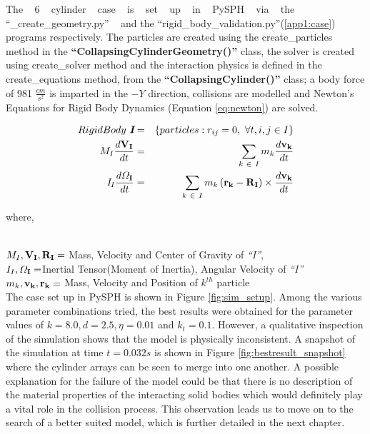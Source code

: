 The ~ 6 ~ cylinder ~ case ~ is ~ set ~ up ~ in ~ PySPH ~ via ~ the ~ ``\_create\_geometry.py'' ~ and the   ``rigid\_body\_validation.py''(\ref{app1:case}) programs respectively. The particles are created using the create\_particles method in the \textbf{``CollapsingCylinderGeometry()''} class, the solver is created using create\_solver method and the interaction physics is defined in the create\_equations method, from the \textbf{``CollapsingCylinder()''} class; a body force of 981 $\frac{cm}{s^2}$ is imparted in the $-Y$ direction, collisions are modelled and Newton's Equations for Rigid Body Dynamics (Equation \ref{eq:newton}) are solved.

\begin{eqnarray}\label{eq:newton}
Rigid Body ~{\textit{\textbf{I}}} &=& \left\lbrace particles : r_{ij} = 0, ~ \forall t , i,j \in I\right\rbrace \nonumber \\
M_{I}\frac{d{\it{{\bf{V_I}}}}}{dt} &=& \sum_{k~\in~I} m_{k} \frac{d{\it{{\bf{v_k}}}}}{dt} \\
{\bf{\it{I_I}}} \frac{d{\bf{\varOmega _{I}}}}{dt} &=& \sum_{k~\in~I} m_{k}\left( {\bf{r_k - R_I}}\right) \times \frac{d{\it{{\bf{v_k}}}}}{dt} \nonumber
\end{eqnarray}

{\raggedright{where,}} \\
$M_I , {\it{\bf{V_I}}}, {\it{\bf{R_I}}} = $ Mass, Velocity and Center of Gravity of {\it{``I''}}, \\
$I_I , {{\bf{\varOmega _{I}}}} = $Inertial Tensor(Moment of Inertia), Angular Velocity of {\it{``I''}} \\
$m_k , {\it{{\bf{v_k}}}}, \bf{r_k} =$ Mass, Velocity and Position of $k^{th}$ particle\\

The case set up in PySPH is shown in Figure \ref{fig:sim_setup}. Among the various parameter combinations tried, the best results were obtained for the parameter values of $k = 8.0, d = 2.5, \eta = 0.01$ and $k_t = 0.1$. However, a qualitative inspection of the simulation shows that the model is physically inconsistent. A snapshot of the simulation at time $t = 0.032s$ is shown in Figure \ref{fig:bestresult_snapshot} where the cylinder arrays can be seen to merge into one another. A possible explanation for the failure of the model could be that there is no description of the material properties of the interacting solid bodies which would definitely play a vital role in the collision process. This observation leads us to move on to the search of a better suited model, which is further detailed in the next chapter.


